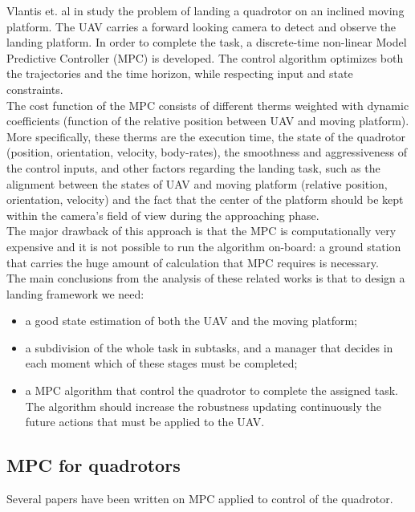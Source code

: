 Vlantis et. al in \cite{vlantis2015quadrotor} study the problem of landing a quadrotor on an inclined moving platform. The UAV carries a forward looking camera to detect and observe the landing platform. In order to complete the task, a discrete-time non-linear Model Predictive Controller (MPC) \cite{camacho2013model} is developed. The control algorithm optimizes both the trajectories and the time horizon, while respecting input and state constraints.\\ 
The cost function of the MPC consists of different therms weighted with dynamic coefficients (function of the relative position between UAV and moving platform). More specifically, these therms are the execution time, the state of the quadrotor (position, orientation, velocity, body-rates), the smoothness and aggressiveness of the control inputs, and other factors regarding the landing task, such as the alignment between the states of UAV and moving platform (relative position, orientation, velocity) and the fact that the center of the platform should be kept within the camera's field of view during the approaching phase.\\
The major drawback of this approach is that the MPC is computationally very expensive and it is not possible to run the algorithm on-board: a ground station that carries the huge amount of calculation that MPC requires is necessary.\\

The main conclusions from the analysis of these related works is that to design a landing framework we need:
\begin{itemize}
\item a good state estimation of both the UAV and the moving platform;
\item a subdivision of the whole task in subtasks, and a manager that decides in each moment which of these stages must be completed;
\item a MPC algorithm that control the quadrotor to complete the assigned task. The algorithm should increase the robustness updating continuously the future actions that must be applied to the UAV.
\end{itemize}

\subsection{MPC for quadrotors}

Several papers have been written on MPC applied to control of the quadrotor.


